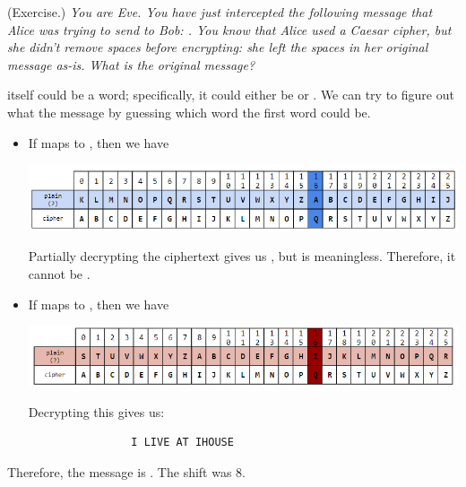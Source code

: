 \documentclass[letterpaper]{article}
\begin{document}
\begin{mdframed}
    (Exercise.) \emph{You are Eve. You have just intercepted the following message that Alice was trying to send to Bob: . You know that Alice used a Caesar cipher, but she didn't remove spaces before encrypting: she left the spaces in her original message as-is. What is the original message?}
    
    \begin{mdframed}
         itself could be a word; specifically, it could either be  or . We can try to figure out what the message by guessing which word the first word could be. 
        \begin{itemize}
            \item If  maps to , then we have 
            \begin{center}
                \includegraphics[scale=0.6]{../assets/ceasar_4.png}
            \end{center}
            Partially decrypting the ciphertext gives us , but  is meaningless. Therefore, it cannot be . 

            \item If  maps to , then we have
            \begin{center}
                \includegraphics[scale=0.6]{../assets/ceasar_5.png}
            \end{center}
            Decrypting this gives us: 
            \begin{verbatim}
                I LIVE AT IHOUSE\end{verbatim}
        \end{itemize}
        Therefore, the message is . The shift was 8.
    \end{mdframed}
\end{mdframed}
\end{document}
